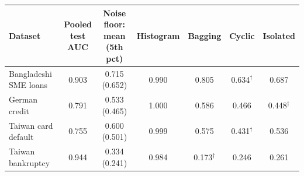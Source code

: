 \begin{tabular}{lcccccc}
\toprule
Dataset & \makecell{Pooled\\test AUC} & \makecell{Noise floor:\\mean (5th pct)} & Histogram & Bagging & Cyclic & Isolated \\
\midrule
Bangladeshi SME loans & 0.903 & 0.715 (0.652) & 0.990 & 0.805 & 0.634$^\dagger$ & 0.687 \\
German credit & 0.791 & 0.533 (0.465) & 1.000 & 0.586 & 0.466 & 0.448$^\dagger$ \\
Taiwan card default & 0.755 & 0.600 (0.501) & 0.999 & 0.575 & 0.431$^\dagger$ & 0.536 \\
Taiwan bankruptcy & 0.944 & 0.334 (0.241) & 0.984 & 0.173$^\dagger$ & 0.246 & 0.261 \\
\bottomrule
\end{tabular}
